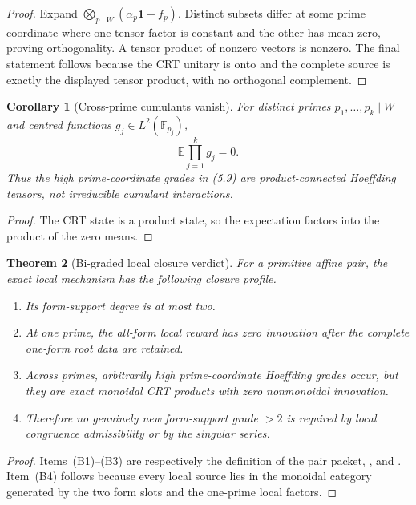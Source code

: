 \documentclass[11pt]{article}
\newtheorem{theorem}{Theorem}[section]
\newtheorem{corollary}[theorem]{Corollary}
\theoremstyle{definition}
\theoremstyle{remark}
\newcommand{\F}{\mathbb F}
\newcommand{\one}{\mathbf 1}
\begin{document}
\begin{proof}
Expand
$\bigotimes_{p\mid W}(\alpha_p\one+f_p)$.  Distinct subsets differ at some
prime coordinate where one tensor factor is constant and the other has mean
zero, proving orthogonality.  A tensor product of nonzero vectors is nonzero.
The final statement follows because the CRT unitary is onto and the complete
source is exactly the displayed tensor product, with no orthogonal complement.
\end{proof}

\begin{corollary}[Cross-prime cumulants vanish]
\label{cor:prime-cumulants}
For distinct primes $p_1,\ldots,p_k\mid W$ and centred functions
$g_j\in L^2(\F_{p_j})$,
\[
 \boxed{
 \mathbb E\prod_{j=1}^k g_j=0.}
 \tag{5.10}
\]
Thus the high prime-coordinate grades in \textup{(5.9)} are product-connected
Hoeffding tensors, not irreducible cumulant interactions.
\end{corollary}

\begin{proof}
The CRT state is a product state, so the expectation factors into the product
of the zero means.
\end{proof}

\begin{theorem}[Bi-graded local closure verdict]
\label{thm:bigraded-verdict}
For a primitive affine pair, the exact local mechanism has the following
closure profile.
\begin{enumerate}[label=\textup{(B\arabic*)},leftmargin=3em]
\item Its form-support degree is at most two.
\item At one prime, the all-form local reward has zero innovation after the
      complete one-form root data are retained.
\item Across primes, arbitrarily high prime-coordinate Hoeffding grades occur,
      but they are exact monoidal CRT products with zero nonmonoidal innovation.
\item Therefore no genuinely new form-support grade $>2$ is required by local
      congruence admissibility or by the singular series.
\end{enumerate}
\end{theorem}

\begin{proof}
Items~\textup{(B1)}--\textup{(B3)} are respectively the definition of the pair
packet, , and
.  Item~\textup{(B4)} follows because
every local source lies in the monoidal category generated by the two form
slots and the one-prime local factors.
\end{proof}
\end{document}
